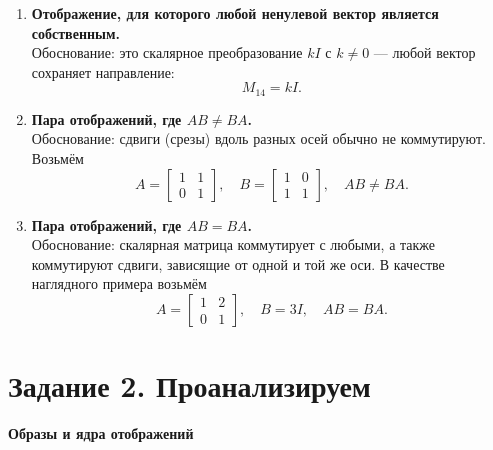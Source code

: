 \begin{enumerate}
  \item \textbf{Отображение, для которого любой ненулевой вектор является собственным.}\\
  Обоснование: это скалярное преобразование $kI$ с $k\neq 0$ — любой вектор сохраняет направление:
  \[
    M_{14} = k I.
  \]

  \item \textbf{Пара отображений, где $AB \neq BA$.}\\
  Обоснование: сдвиги (срезы) вдоль разных осей обычно не коммутируют. Возьмём
  \[
    A = \begin{bmatrix} 1 & 1 \\ 0 & 1 \end{bmatrix},\quad
    B = \begin{bmatrix} 1 & 0 \\ 1 & 1 \end{bmatrix},\quad AB\ne BA.
  \]

  \item \textbf{Пара отображений, где $AB = BA$.}\\
  Обоснование: скалярная матрица коммутирует с любыми, а также коммутируют сдвиги, зависящие от одной и той же оси. В качестве наглядного примера возьмём
  \[
    A = \begin{bmatrix} 1 & 2 \\ 0 & 1 \end{bmatrix},\quad
    B = 3I,\quad AB=BA.
  \]
\end{enumerate}

\section*{Задание 2. Проанализируем}

\textbf{Образы и ядра отображений}

